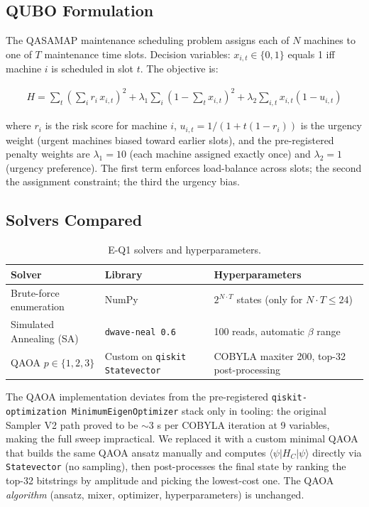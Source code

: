 \subsection{QUBO Formulation}

The QASAMAP maintenance scheduling problem assigns each of $N$ machines to one of $T$ maintenance time slots. Decision variables: $x_{i,t} \in \{0, 1\}$ equals 1 iff machine $i$ is scheduled in slot $t$. The objective is:

\begin{align}
H = \sum_t \left( \sum_i r_i \, x_{i,t} \right)^2 + \lambda_1 \sum_i \left( 1 - \sum_t x_{i,t} \right)^2 + \lambda_2 \sum_{i,t} x_{i,t} (1 - u_{i,t})
\label{eq:qubo_eq1}
\end{align}

where $r_i$ is the risk score for machine $i$, $u_{i,t} = 1 / (1 + t (1 - r_i))$ is the urgency weight (urgent machines biased toward earlier slots), and the pre-registered penalty weights are $\lambda_1 = 10$ (each machine assigned exactly once) and $\lambda_2 = 1$ (urgency preference). The first term enforces load-balance across slots; the second the assignment constraint; the third the urgency bias.

\subsection{Solvers Compared}

\begin{table}[h!]
\centering
\caption{E-Q1 solvers and hyperparameters.}
\label{tab:eq1_solvers}
\begin{tabular}{lll}
\hline
\textbf{Solver} & \textbf{Library} & \textbf{Hyperparameters} \\
\hline
Brute-force enumeration & NumPy & $2^{N \cdot T}$ states (only for $N \cdot T \le 24$) \\
Simulated Annealing (SA) & \texttt{dwave-neal 0.6} & 100 reads, automatic $\beta$ range \\
QAOA $p \in \{1, 2, 3\}$ & Custom on \texttt{qiskit Statevector} & COBYLA maxiter 200, top-32 post-processing \\
\hline
\end{tabular}
\end{table}

The QAOA implementation deviates from the pre-registered \texttt{qiskit-optimization MinimumEigenOptimizer} stack only in tooling: the original Sampler V2 path proved to be $\sim$3 s per COBYLA iteration at 9 variables, making the full sweep impractical. We replaced it with a custom minimal QAOA that builds the same QAOA ansatz manually and computes $\langle \psi | H_C | \psi \rangle$ directly via \texttt{Statevector} (no sampling), then post-processes the final state by ranking the top-32 bitstrings by amplitude and picking the lowest-cost one. The QAOA \emph{algorithm} (ansatz, mixer, optimizer, hyperparameters) is unchanged.


